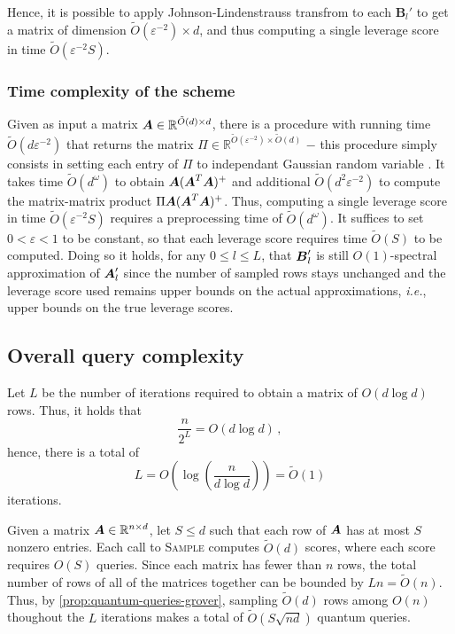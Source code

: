 \begin{proofEnd}
Hence, it is possible to apply Johnson-Lindenstrauss transfrom to each
$\boldsymbol{B}_{l}'$ to get a matrix of dimension $\tilde O(\varepsilon^{-2})
\times d$, and thus computing a single leverage score in time $\tilde
O(\varepsilon^{-2}S)$.

\end{proofEnd}

\subsubsection{Time complexity of the scheme}\label{sec:time-complexity-jl}
Given as input a matrix $\boldsymbol A \in \mathbb{R}^{\tilde O(d) \times d}$, there is a
procedure with running time $\tilde O(d\varepsilon^{-2})$ that returns the
matrix $\Pi \in \mathbb R^{\tilde O(\varepsilon^{-2})\times \tilde O(d)}$ $-$
this procedure simply consists in setting each entry of $\Pi$ to independant
Gaussian random variable \cite{dasgupta_elementary_2003}. It takes time $\tilde
O (d^\omega)$ to obtain $\boldsymbol A(\boldsymbol A^T\boldsymbol A)^+$ and additional $\tilde
O(d^{2}\varepsilon^{-2})$ to compute the matrix-matrix product $\Pi
\boldsymbol A(\boldsymbol A^T\boldsymbol A)^+$. Thus, computing a single leverage score in time $\tilde
O(\varepsilon^{-2}S)$ requires a preprocessing time of $\tilde O(d^\omega)$. It
suffices to set $0 < \varepsilon < 1$ to be constant, so that each leverage
score requires time $\tilde O(S)$ to be computed. Doing so it holds, for any $0
\leq l \leq L$, that $\boldsymbol B'_l$ is still $O(1)$-spectral approximation of $\boldsymbol A'_l$
since the number of sampled rows stays unchanged and the leverage score used
remains upper bounds on the actual approximations, \emph{i.e.}, upper bounds on
the true leverage scores.

\subsection{Overall query complexity}
Let $L$ be the number of iterations required to obtain a matrix of $O(d\log d)$
rows. Thus, it holds that
$$
\frac{n}{2^L} = O(d \log d) \, ,
$$
hence, there is a total of
$$L = O(\log (\frac{n}{d \log d})) = \tilde O(1)$$
iterations.

Given a matrix $\boldsymbol A \in \mathbb{R}^{n \times d}$, let $S\leq d$ such that each
row of $\boldsymbol A$ has at most $S$ nonzero entries. Each call to \textsc{Sample}
computes $\tilde O(d)$ scores, where each score requires $O(S)$ queries. Since
each matrix has fewer than $n$ rows, the total number of rows of all of the
matrices together can be bounded by $Ln = \tilde O(n)$. Thus, by
\autoref{prop:quantum-queries-grover}, sampling $\tilde O(d)$ rows among $O(n)$
thoughout the $L$ iterations makes a total of $\tilde O(S\sqrt{nd})$ quantum
queries.

